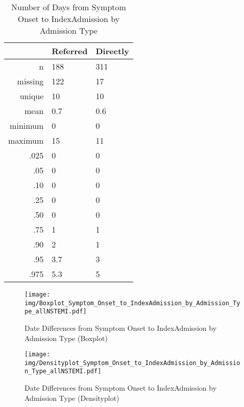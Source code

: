 \documentclass[a4paper]{report}
\begin{document}
\begin{itemize}
{\clearpage

\begin{table}[ht]
\centering
\begin{tabular}{rll}
  \toprule
 & Referred & Directly \\ 
  \midrule
n & 188 & 311 \\ 
  missing & 122 & 17 \\ 
  unique & 10 & 10 \\ 
  mean & 0.7 & 0.6 \\ 
  minimum & 0 & 0 \\ 
  maximum & 15 & 11 \\ 
  .025 & 0 & 0 \\ 
  .05 & 0 & 0 \\ 
  .10 & 0 & 0 \\ 
  .25 & 0 & 0 \\ 
  .50 & 0 & 0 \\ 
  .75 & 1 & 1 \\ 
  .90 & 2 & 1 \\ 
  .95 & 3.7 & 3 \\ 
  .975 & 5.3 & 5 \\ 
   \bottomrule
\end{tabular}
\caption{Number of Days from Symptom Onset to IndexAdmission by Admission Type} 
\end{table}
\begin{figure}
  \centering
  \caption{Date Differences from Symptom Onset to IndexAdmission by Admission Type (Boxplot)}
  \label{Boxplot: Date Differences from Symptom Onset to IndexAdmission by Admission Type}
\texttt{[image: img/Boxplot\_Symptom\_Onset\_to\_IndexAdmission\_by\_Admission\_Type\_allNSTEMI.pdf]}\end{figure}


\begin{figure}
  \centering
  \caption{Date Differences from Symptom Onset to IndexAdmission by Admission Type (Densityplot)}
  \label{Density: Date Differences from Symptom Onset to IndexAdmission by Admission Type}
\texttt{[image: img/Densityplot\_Symptom\_Onset\_to\_IndexAdmission\_by\_Admission\_Type\_allNSTEMI.pdf]}\end{figure}


\clearpage

}
\end{itemize}
\end{document}
